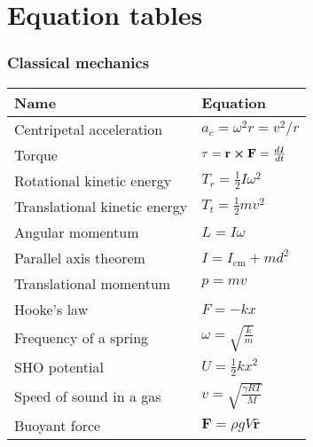 \documentclass[11pt]{paper}
\begin{document}
\newpage
\section*{Equation tables}
\label{sec:eqtab}
\subsubsection*{Classical mechanics}
\label{subsec:classical}


\centering
\label{my-label}
\bgroup
\def\arraystretch{2}
\begin{longtable}{ll}
\textbf{Name}       & \textbf{Equation}          \\ \hline
\multicolumn{1}{|l|}{Centripetal acceleration} & \multicolumn{1}{l|}{$a_c = \omega^2r = v^2/r$} \\ \hline
\multicolumn{1}{|l|}{Torque} & \multicolumn{1}{l|}{$\tau = \mathbf{r}\cross\mathbf{F} = \frac{dI}{dt}$} \\ \hline
\multicolumn{1}{|l|}{Rotational kinetic energy} & \multicolumn{1}{l|}{$T_r = \frac{1}{2}I\omega^2$} \\ \hline
\multicolumn{1}{|l|}{Translational kinetic energy} & \multicolumn{1}{l|}{$T_t = \frac{1}{2}mv^2$} \\ \hline
\multicolumn{1}{|l|}{Angular momentum} & \multicolumn{1}{l|}{$L = I\omega$} \\ \hline
\multicolumn{1}{|l|}{Parallel axis theorem} & \multicolumn{1}{l|}{$I = I_\text{cm} + md^2$} \\ \hline
\multicolumn{1}{|l|}{Translational momentum} & \multicolumn{1}{l|}{$p = mv$} \\ \hline
\multicolumn{1}{|l|}{Hooke's law} & \multicolumn{1}{l|}{$F = -kx$} \\ \hline
\multicolumn{1}{|l|}{Frequency of a spring} & \multicolumn{1}{l|}{$\omega = \sqrt{\frac{k}{m}}$} \\ \hline
\multicolumn{1}{|l|}{SHO potential} & \multicolumn{1}{l|}{$U = \frac{1}{2}kx^2$} \\ \hline
\multicolumn{1}{|l|}{Speed of sound in a gas} & \multicolumn{1}{l|}{$v = \sqrt{\frac{\gamma RT}{M}}$} \\ \hline
\multicolumn{1}{|l|}{Buoyant force} & \multicolumn{1}{l|}{$\mathbf{F} = \rho g V \mathbf{\hat{r}}$} \\ \hline

\end{longtable}
\end{document}
